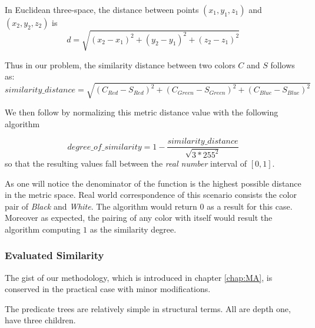 \documentclass[egilmezThesis.tex]{subfiles}
\begin{document}
In Euclidean three-space, the distance between points $(x_1, y_1, z_1)$ and $(x_2, y_2, z_2)$ is
$$d=\sqrt{(x_2-x_1)^2+(y_2-y_1)^2+(z_2-z_1)^2}$$

Thus in our problem, the similarity distance between two colors $C$ and $S$ follows as:
$$similarity\_distance=\sqrt{(C_{Red}-S_{Red})^2+(C_{Green}-S_{Green})^2+(C_{Blue}-S_{Blue})^2}$$

We then follow by normalizing this metric distance value with the following algorithm

$$degree\_of\_similarity = 1 - \frac{similarity\_distance}{\sqrt{3*255^2}}$$
so that the resulting values fall between the \textit{real number} interval of $[0,1]$.

As one will notice the denominator of the function is the highest possible distance in the metric space. Real world correspondence of this scenario consists the color pair of \textit{Black} and \textit{White}. The algorithm would return $0$ as a result for this case. Moreover as expected, the pairing of any color with itself would result the algorithm computing $1$ as the similarity degree.

\subsubsection{Evaluated Similarity}
\label{evalSimPrac}

The gist of our methodology, which is introduced in chapter \ref{chap:MA}, is conserved in the practical case with minor modifications.

The predicate trees are relatively simple in structural terms. All are depth one, have three children.
\end{document}
